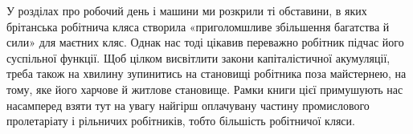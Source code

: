 У розділах про робочий день і машини ми розкрили ті обставини,
в яких брітанська робітнича кляса створила «приголомшливе
збільшення багатства й сили» для маєтних кляс. Однак
нас тоді цікавив переважно робітник підчас його суспільної
функції. Щоб цілком висвітлити закони капіталістичної акумуляції,
треба також на хвилину зупинитись на становищі робітника
поза майстернею, на тому, яке його харчове й житлове становище.
Рамки книги цієї примушують нас насамперед взяти тут на увагу
найгірш оплачувану частину промислового пролетаріату і рільничих
робітників, тобто більшість робітничої кляси.
